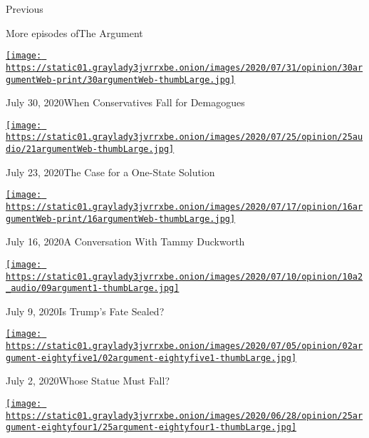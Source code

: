 Previous

More episodes ofThe Argument

\href{https://www.nytimes3xbfgragh.onion/2020/07/30/opinion/the-argument-authoritarianism-anne-applebaum.html?action=click\&module=audio-series-bar\&region=header\&pgtype=Article}{\texttt{[image: https://static01.graylady3jvrrxbe.onion/images/2020/07/31/opinion/30argumentWeb-print/30argumentWeb-thumbLarge.jpg]}}

July 30, 2020When Conservatives Fall for Demagogues

\href{https://www.nytimes3xbfgragh.onion/2020/07/23/opinion/the-argument-israel-palestinian.html?action=click\&module=audio-series-bar\&region=header\&pgtype=Article}{\texttt{[image: https://static01.graylady3jvrrxbe.onion/images/2020/07/25/opinion/25audio/21argumentWeb-thumbLarge.jpg]}}

July 23, 2020The Case for a One-State Solution

\href{https://www.nytimes3xbfgragh.onion/2020/07/16/opinion/the-argument-tammy-duckworth.html?action=click\&module=audio-series-bar\&region=header\&pgtype=Article}{\texttt{[image: https://static01.graylady3jvrrxbe.onion/images/2020/07/17/opinion/16argumentWeb-print/16argumentWeb-thumbLarge.jpg]}}

July 16, 2020A Conversation With Tammy Duckworth

\href{https://www.nytimes3xbfgragh.onion/2020/07/09/opinion/is-trumps-fate-sealed.html?action=click\&module=audio-series-bar\&region=header\&pgtype=Article}{\texttt{[image: https://static01.graylady3jvrrxbe.onion/images/2020/07/10/opinion/10a2\_audio/09argument1-thumbLarge.jpg]}}

July 9, 2020Is Trump's Fate Sealed?

\href{https://www.nytimes3xbfgragh.onion/2020/07/02/opinion/the-argument-protest-statue-revolution.html?action=click\&module=audio-series-bar\&region=header\&pgtype=Article}{\texttt{[image: https://static01.graylady3jvrrxbe.onion/images/2020/07/05/opinion/02argument-eightyfive1/02argument-eightyfive1-thumbLarge.jpg]}}

July 2, 2020Whose Statue Must Fall?

\href{https://www.nytimes3xbfgragh.onion/2020/06/25/opinion/the-argument-biden-vice-president-supreme-court.html?action=click\&module=audio-series-bar\&region=header\&pgtype=Article}{\texttt{[image: https://static01.graylady3jvrrxbe.onion/images/2020/06/28/opinion/25argument-eightyfour1/25argument-eightyfour1-thumbLarge.jpg]}}

